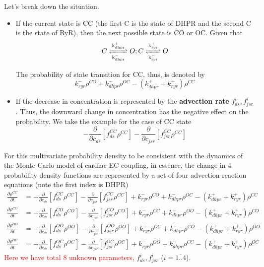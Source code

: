 Let's break down the situation.
\begin{itemize}
\item If the current state is CC (the first C is the state of DHPR and
  the second C is the state of RyR), then the next possible state is
  CO or OC. Given that
  \begin{equation}
    \label{eq:194}
    \begin{split}
       C \ce{<=>[k^+_{dhpr}][k^-_{dhpr}]} O;      C \ce{<=>[k^+_{ryr}][k^-_{ryr}]} O 
    \end{split}
  \end{equation}

  The probability of state transition for CC, thus, is denoted by
  \begin{equation}
    \label{eq:197}
    k^-_{ryr}\rho^{CO} + k^-_{dhpr} \rho^{OC} - (k^+_{dhpr}+k^+_{ryr})\rho^{CC}
  \end{equation}

\item If the decrease in concentration is represented by the {\bf advection
  rate} $f^i_{ds}, f^i_{jsr}$. Thus, the downward change in
  concentration has the negative effect on the probability.  We take
  the example for the case of CC state
  \begin{equation}
    \label{eq:198}
    -\frac{\partial}{\partial c_{ds}}[f^{CC}_{ds}\rho^{CC}] -\frac{\partial}{\partial c_{jsr}}[f^{CC}_{jsr}\rho^{CC}]
  \end{equation}
\end{itemize}

For this multivariate probability density to be consistent with the
dynamics of the Monte Carlo model of cardiac EC coupling, in essence,
the change in 4 probability density functions are represented by a set
of four advection-reaction equations (note the first index is DHPR)
\begin{equation}
  \label{eq:196}
  \begin{split}
    \frac{\partial \rho^{CC}}{\partial t} &=   -\frac{\partial}{\partial  c_{ds}}[f^{CC}_{ds}\rho^{CC}] -\frac{\partial}{\partial
    c_{jsr}}[f^{CC}_{jsr}\rho^{CC}] + k^-_{ryr}\rho^{CO} + k^-_{dhpr} \rho^{OC} - (k^+_{dhpr}+k^+_{ryr})\rho^{CC} \\ 
  \frac{\partial \rho^{CO}}{\partial t} &=  -\frac{\partial}{\partial  c_{ds}}[f^{CO}_{ds}\rho^{CO}] -\frac{\partial}{\partial
    c_{jsr}}[f^{CO}_{jsr}\rho^{CO}] + k^-_{ryr}\rho^{CC} + k^-_{dhpr}
  \rho^{OO} - (k^+_{dhpr}+k^+_{ryr}) \rho^{CO} \\
  \frac{\partial \rho^{OO}}{\partial t} &= -\frac{\partial}{\partial  c_{ds}}[f^{OO}_{ds}\rho^{OO}] -\frac{\partial}{\partial
    c_{jsr}}[f^{OO}_{jsr}\rho^{OO}] + k^-_{ryr}\rho^{OC} + k^-_{dhpr}
  \rho^{CO} - (k^+_{dhpr}+k^+_{ryr}) \rho^{OO}   \\
  \frac{\partial \rho^{OC}}{\partial t} &=  -\frac{\partial}{\partial  c_{ds}}[f^{OC}_{ds}\rho^{OC}] -\frac{\partial}{\partial
    c_{jsr}}[f^{OC}_{jsr}\rho^{OC}] + k^-_{ryr}\rho^{OO} + k^-_{dhpr}
  \rho^{CC} - (k^+_{dhpr}+k^+_{ryr}) \rho^{OC}  
  \end{split}
\end{equation}
\textcolor{red}{Here we have total 8 unknown parameters,} $f^i_{ds},
f^i_{jsr}$ ($i=\overline{1..4}$).

